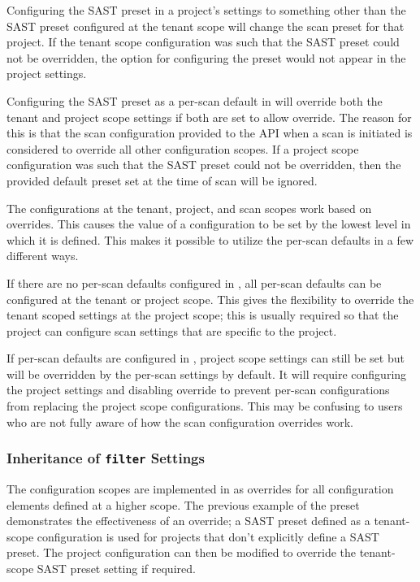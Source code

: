 Configuring the SAST preset in a project's settings to something other than
the SAST preset configured at the tenant scope will change the scan preset for that project.
If the tenant scope configuration was such that the SAST preset could not be overridden, the
option for configuring the preset would not appear in the project settings.

Configuring the SAST preset as a per-scan default in \cxoneflow will override both
the tenant and project scope settings if both are set to allow override.  The reason for this
is that the scan configuration provided to the API when a scan is initiated is considered to override
all other configuration scopes.  If a project scope configuration was such that the SAST preset could
not be overridden, then the \cxoneflow provided default preset set at the time of scan will be ignored.

The configurations at the tenant, project, and scan scopes work based on overrides.
This causes the value of a configuration to be set by the lowest level in which it is
defined. This makes it possible to utilize the \cxoneflow per-scan defaults in a few
different ways.

If there are no per-scan defaults configured in \cxoneflowns, all per-scan defaults
can be configured at the tenant or project scope.  This gives the flexibility to override 
the tenant scoped settings at the project scope; this is usually required so that
the project can configure scan settings that are specific to the project.

If per-scan defaults are configured in \cxoneflowns, project scope settings can
still be set but will be overridden by the \cxoneflow per-scan settings by default.  It will require
configuring the project settings and disabling override to prevent \cxoneflow per-scan
configurations from replacing the project scope configurations.  This may be confusing
to users who are not fully aware of how the scan configuration overrides work.

\subsubsection{\cxoneflow Inheritance of \texttt{filter} Settings}

The configuration scopes are implemented in \cxone as overrides for all
configuration elements defined at a higher scope.  The previous example of the
preset demonstrates the effectiveness of an override; a SAST preset defined
as a tenant-scope configuration is used for projects that don't explicitly define
a SAST preset.  The project configuration can then be modified to override the tenant-scope
SAST preset setting if required.

